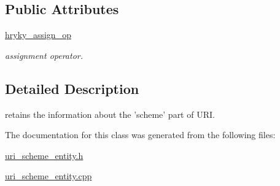 \subsection*{Public Attributes}
\begin{DoxyCompactItemize}
\item 
\hypertarget{classhryky_1_1uri_1_1scheme_1_1_entity_acc47079285a707038204ebe90e29b542}{\hyperlink{classhryky_1_1uri_1_1scheme_1_1_entity_acc47079285a707038204ebe90e29b542}{hryky\-\_\-assign\-\_\-op}}\label{classhryky_1_1uri_1_1scheme_1_1_entity_acc47079285a707038204ebe90e29b542}

\begin{DoxyCompactList}\small\item\em assignment operator. \end{DoxyCompactList}\end{DoxyCompactItemize}


\subsection{Detailed Description}
retains the information about the 'scheme' part of U\-R\-I. 

The documentation for this class was generated from the following files\-:\begin{DoxyCompactItemize}
\item 
\hyperlink{uri__scheme__entity_8h}{uri\-\_\-scheme\-\_\-entity.\-h}\item 
\hyperlink{uri__scheme__entity_8cpp}{uri\-\_\-scheme\-\_\-entity.\-cpp}\end{DoxyCompactItemize}
